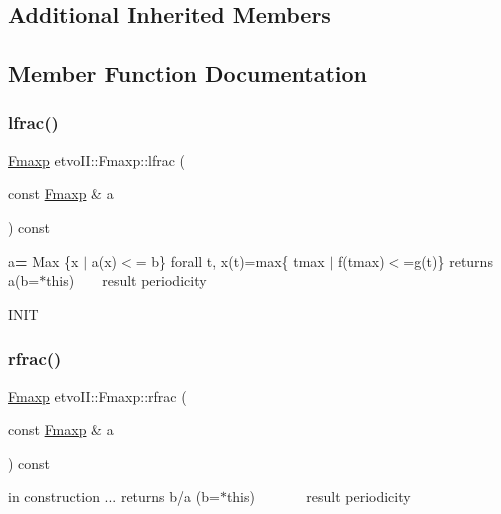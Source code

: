 \subsection*{Additional Inherited Members}


\subsection{Member Function Documentation}
\mbox{\label{classetvo_i_i_1_1_fmaxp_ad72699ad7193e83e3412cde79c1a461d}} 
\subsubsection{\texorpdfstring{lfrac()}{lfrac()}}
{\footnotesize\ttfamily \mbox{\hyperlink{classetvo_i_i_1_1_fmaxp}{Fmaxp}} etvo\+I\+I\+::\+Fmaxp\+::lfrac (\begin{DoxyParamCaption}\item[{const \mbox{\hyperlink{classetvo_i_i_1_1_fmaxp}{Fmaxp}} \&}]{a }\end{DoxyParamCaption}) const}

a{\bfseries =} Max \{x $\vert$ a(x)$<$= b\} forall t, x(t)=max\{ tmax $\vert$ f(tmax)$<$=g(t)\} returns a{\bfseries }(b=$\ast$this) ~\newline
~\newline
 result periodicity

I\+N\+IT \mbox{\label{classetvo_i_i_1_1_fmaxp_a60837ce28327bcb91be8f5260d90e40c}} 
\subsubsection{\texorpdfstring{rfrac()}{rfrac()}}
{\footnotesize\ttfamily \mbox{\hyperlink{classetvo_i_i_1_1_fmaxp}{Fmaxp}} etvo\+I\+I\+::\+Fmaxp\+::rfrac (\begin{DoxyParamCaption}\item[{const \mbox{\hyperlink{classetvo_i_i_1_1_fmaxp}{Fmaxp}} \&}]{a }\end{DoxyParamCaption}) const}

in construction ... returns b/a (b=$\ast$this) ~\newline
~\newline
~\newline
~\newline
 result periodicity

